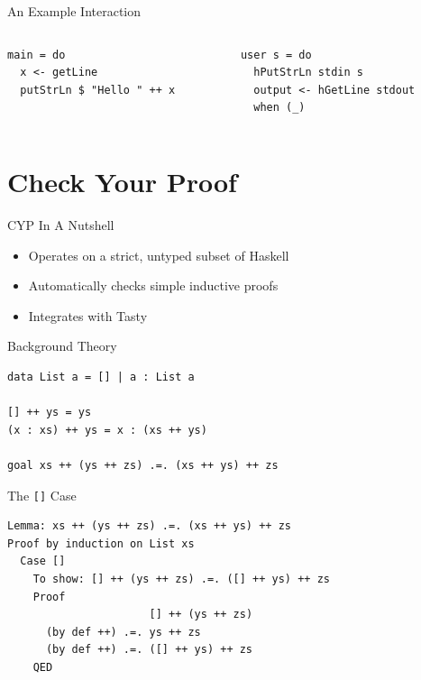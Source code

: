 \documentclass{beamer}
\begin{document}
\begin{frame}[fragile]{An Example Interaction}
  \begin{columns}
    \begin{column}{0.5\textwidth}
\begin{verbatim}
main = do
  x <- getLine
  putStrLn $ "Hello " ++ x
\end{verbatim}
    \end{column}
    \begin{column}{0.5\textwidth}
\begin{verbatim}
user s = do
  hPutStrLn stdin s
  output <- hGetLine stdout
  when (_)
\end{verbatim}
    \end{column}
  \end{columns}
\end{frame}

\section{Check Your Proof}

\begin{frame}{CYP In A Nutshell}

\begin{itemize}[<+->]
  \item Operates on a strict, untyped subset of Haskell
  \item Automatically checks simple inductive proofs
  \item Integrates with Tasty
\end{itemize}
\end{frame}

\begin{frame}[fragile]{Background Theory}
\lstset{language=CYP}
  \begin{lstlisting}
data List a = [] | a : List a

[] ++ ys = ys
(x : xs) ++ ys = x : (xs ++ ys)

goal xs ++ (ys ++ zs) .=. (xs ++ ys) ++ zs
  \end{lstlisting}
\end{frame}

\begin{frame}[fragile]{The \texttt{[]} Case}
  \begin{lstlisting}
Lemma: xs ++ (ys ++ zs) .=. (xs ++ ys) ++ zs
Proof by induction on List xs
  Case []
    To show: [] ++ (ys ++ zs) .=. ([] ++ ys) ++ zs
    Proof
                      [] ++ (ys ++ zs)
      (by def ++) .=. ys ++ zs
      (by def ++) .=. ([] ++ ys) ++ zs
    QED
  \end{lstlisting}
\end{frame}
\end{document}
